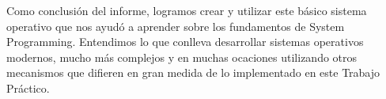 Como conclusión del informe, logramos crear y utilizar este básico sistema operativo que nos ayudó a aprender sobre los fundamentos de System Programming.
Entendimos lo que conlleva desarrollar sistemas operativos modernos, mucho más complejos y en muchas ocaciones utilizando otros mecanismos que difieren en gran medida de lo implementado en este Trabajo Práctico.
